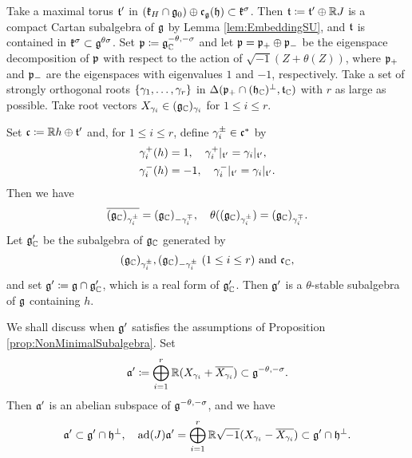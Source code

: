Take a maximal torus $\mathfrak{t}'$ in $(\mathfrak{k}_H\cap \mathfrak{g}_0) \oplus \mathfrak{c}_{\mathfrak{g}}(\mathfrak{h}) \subset \mathfrak{k}^\sigma$.
Then $\mathfrak{t}\coloneq \mathfrak{t}'\oplus \mathbb{R} J$ is a compact Cartan subalgebra of $\mathfrak{g}$ by Lemma \ref{lem:EmbeddingSU}, and $\mathfrak{t}$ is contained in $\mathfrak{k}^{\sigma} \subset \mathfrak{g}^{\theta\sigma}$.
Set $\mathfrak{p} \coloneq \mathfrak{g}^{-\theta, -\sigma}_{\mathbb{C}}$ and let $\mathfrak{p} = \mathfrak{p}_+\oplus \mathfrak{p}_-$ be the eigenspace decomposition of $\mathfrak{p}$ with respect to the action of $\sqrt{-1}(Z+\theta(Z))$, where $\mathfrak{p}_+$ and $\mathfrak{p}_-$ are the eigenspaces with eigenvalues $1$ and $-1$, respectively.
Take a set of strongly orthogonal roots $\left\{\gamma_1, \ldots, \gamma_r \right\}$ in $\Delta(\mathfrak{p}_+\cap (\mathfrak{h}_{\mathbb{C}})^\perp, \mathfrak{t}_{\mathbb{C}})$ with $r$ as large as possible.
Take root vectors $X_{\gamma_i} \in (\mathfrak{g}_{\mathbb{C}})_{\gamma_i}$ for $1 \leq i \leq r$.

Set $\mathfrak{c} \coloneq \mathbb{R} h \oplus \mathfrak{t'}$ and, for $1\leq i\leq r$, define $\gamma^{\pm}_i \in \mathfrak{c}^*$ by
\begin{align*}
	\gamma^{+}_i(h) &= 1, \quad \gamma^{+}_i|_{\mathfrak{t'}} = \gamma_i|_{\mathfrak{t'}}, \\
	\gamma^{-}_i(h) &= -1, \quad \gamma^{-}_i|_{\mathfrak{t'}} = \gamma_i|_{\mathfrak{t'}}.
\end{align*}
Then we have
\begin{align*}
	\overline{(\mathfrak{g}_{\mathbb{C}})_{\gamma^{\pm}_i}} = (\mathfrak{g}_{\mathbb{C}})_{-\gamma^{\mp}_i}, \quad \theta((\mathfrak{g}_{\mathbb{C}})_{\gamma^{\pm}_i}) = (\mathfrak{g}_{\mathbb{C}})_{\gamma^{\mp}_i}.
\end{align*}
Let $\mathfrak{g}_{\mathbb{C}}'$ be the subalgebra of $\mathfrak{g}_{\mathbb{C}}$ generated by
\begin{align*}
	(\mathfrak{g}_{\mathbb{C}})_{\gamma^{\pm}_i}, (\mathfrak{g}_{\mathbb{C}})_{-\gamma^{\pm}_i} \ (1\leq i \leq r) \text{ and } \mathfrak{c}_{\mathbb{C}},
\end{align*}
and set $\mathfrak{g'} \coloneq \mathfrak{g}\cap \mathfrak{g}_{\mathbb{C}}'$, which is a real form of $\mathfrak{g}_{\mathbb{C}}'$.
Then $\mathfrak{g'}$ is a $\theta$-stable subalgebra of $\mathfrak{g}$ containing $h$.

We shall discuss when $\mathfrak{g'}$ satisfies the assumptions of Proposition \ref{prop:NonMinimalSubalgebra}.
Set
\begin{align*}
	\mathfrak{a}' \coloneq \bigoplus_{i=1}^r \mathbb{R}(X_{\gamma_i} + \overline{X_{\gamma_i}}) \subset \mathfrak{g}^{-\theta, -\sigma}.
\end{align*}
Then $\mathfrak{a'}$ is an abelian subspace of $\mathfrak{g}^{-\theta, -\sigma}$, and we have
\begin{align}
	\mathfrak{a'} \subset \mathfrak{g'} \cap \mathfrak{h}^\perp, \quad \mathrm{ad}(J)\mathfrak{a'} = \bigoplus_{i=1}^r \mathbb{R}\sqrt{-1}(X_{\gamma_i} - \overline{X_{\gamma_i}}) \subset \mathfrak{g'} \cap \mathfrak{h}^\perp. \label{eqn:SmallSubalgebraA}
\end{align}

